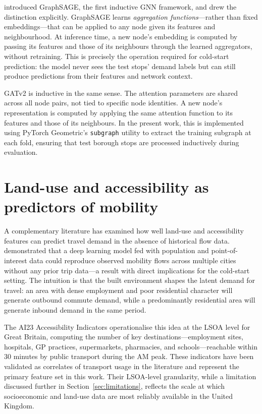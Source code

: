 \documentclass[12pt,a4paper]{report}
\begin{document}
\citet{hamilton2017inductive} introduced GraphSAGE, the first inductive
GNN framework, and drew the distinction explicitly. GraphSAGE learns
\emph{aggregation functions}---rather than fixed embeddings---that can be
applied to any node given its features and neighbourhood. At inference time,
a new node's embedding is computed by passing its features and those of its
neighbours through the learned aggregators, without retraining. This is
precisely the operation required for cold-start prediction: the model never
sees the test stops' demand labels but can still produce predictions from
their features and network context.

GATv2 \citep{brody2022how} is inductive in the same sense. The attention
parameters are shared across all node pairs, not tied to specific node
identities. A new node's representation is computed by applying the same
attention function to its features and those of its neighbours. In the present
work, this is implemented using PyTorch Geometric's \texttt{subgraph} utility
to extract the training subgraph at each fold, ensuring that test borough
stops are processed inductively during evaluation.

\section{Land-use and accessibility as predictors of mobility}
A complementary literature has examined how well land-use and accessibility
features can predict travel demand in the absence of historical flow data.
\citet{simini2021deep} demonstrated that a deep learning model fed with
population and point-of-interest data could reproduce observed mobility flows
across multiple cities without any prior trip data---a result with direct
implications for the cold-start setting. The intuition is that the built
environment shapes the latent demand for travel: an area with dense employment
and poor residential character will generate outbound commute demand, while a
predominantly residential area will generate inbound demand in the same period.

The AI23 Accessibility Indicators \citep{verduzco2024ai23} operationalise
this idea at the LSOA level for Great Britain, computing the number of key
destinations---employment sites, hospitals, GP practices, supermarkets,
pharmacies, and schools---reachable within 30 minutes by public transport
during the AM peak. These indicators have been validated as correlates of
transport usage in the literature and represent the primary feature set in
this work. Their LSOA-level granularity, while a limitation discussed further
in Section~\ref{sec:limitations}, reflects the scale at which socioeconomic
and land-use data are most reliably available in the United Kingdom.
\end{document}
